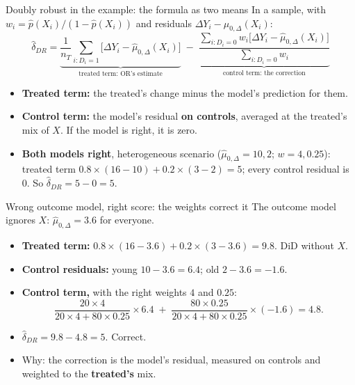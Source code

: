 \documentclass[
  11pt,
  ignorenonframetext,
  aspectratio=169,
]{beamer}
\providecommand{\tightlist}{%
  \setlength{\itemsep}{0pt}\setlength{\parskip}{0pt}}
\begin{document}
\begin{frame}{Doubly robust in the example: the formula as two means}
\protect{}\label{doubly-robust-in-the-example-the-formula-as-two-means}
In a sample, with \(w_i = \hat p(X_i)/(1 - \hat p(X_i))\) and residuals
\(\Delta Y_i - \hat\mu_{0,\Delta}(X_i)\): \[
\hat\delta_{DR} = \underbrace{\frac{1}{n_T}\sum_{i: D_i = 1}\big[\Delta Y_i - \hat\mu_{0,\Delta}(X_i)\big]}_{\text{treated term: OR's estimate}} \;-\; \underbrace{\frac{\sum_{i: D_i = 0} w_i\big[\Delta Y_i - \hat\mu_{0,\Delta}(X_i)\big]}{\sum_{i: D_i = 0} w_i}}_{\text{control term: the correction}}
\]

\begin{itemize}
\tightlist
\item
  \textbf{Treated term:} the treated's change minus the model's
  prediction for them.
\item
  \textbf{Control term:} the model's residual \textbf{on controls},
  averaged at the treated's mix of \(X\). If the model is right, it is
  zero.
\item
  \textbf{Both models right}, heterogeneous scenario
  (\(\hat\mu_{0,\Delta} = 10, 2\); \(w = 4, 0.25\)): treated term
  \(0.8 \times (16 - 10) + 0.2 \times (3 - 2) = 5\); every control
  residual is \(0\). So \(\hat\delta_{DR} = 5 - 0 = 5\).
\end{itemize}
\end{frame}

\begin{frame}{Wrong outcome model, right score: the weights correct it}
\protect{}\label{wrong-outcome-model-right-score-the-weights-correct-it}
The outcome model ignores \(X\): \(\hat\mu_{0,\Delta} = 3.6\) for
everyone.

\begin{itemize}
\tightlist
\item
  \textbf{Treated term:}
  \(0.8 \times (16 - 3.6) + 0.2 \times (3 - 3.6) = 9.8\). DiD without
  \(X\).
\item
  \textbf{Control residuals:} young \(10 - 3.6 = 6.4\); old
  \(2 - 3.6 = -1.6\).
\item
  \textbf{Control term,} with the right weights \(4\) and \(0.25\): \[
  \frac{20 \times 4}{20 \times 4 + 80 \times 0.25} \times 6.4 \;+\; \frac{80 \times 0.25}{20 \times 4 + 80 \times 0.25} \times (-1.6) = 4.8 .
  \]
\item
  \(\hat\delta_{DR} = 9.8 - 4.8 = 5\). Correct.
\item
  Why: the correction is the model's residual, measured on controls and
  weighted to the \textbf{treated's} mix.
\end{itemize}
\end{frame}
\end{document}
